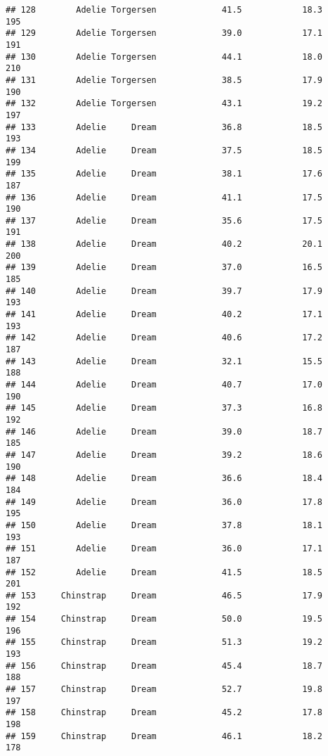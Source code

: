 \documentclass[
]{article}
\begin{document}
\begin{verbatim}
## 128        Adelie Torgersen             41.5            18.3               195
## 129        Adelie Torgersen             39.0            17.1               191
## 130        Adelie Torgersen             44.1            18.0               210
## 131        Adelie Torgersen             38.5            17.9               190
## 132        Adelie Torgersen             43.1            19.2               197
## 133        Adelie     Dream             36.8            18.5               193
## 134        Adelie     Dream             37.5            18.5               199
## 135        Adelie     Dream             38.1            17.6               187
## 136        Adelie     Dream             41.1            17.5               190
## 137        Adelie     Dream             35.6            17.5               191
## 138        Adelie     Dream             40.2            20.1               200
## 139        Adelie     Dream             37.0            16.5               185
## 140        Adelie     Dream             39.7            17.9               193
## 141        Adelie     Dream             40.2            17.1               193
## 142        Adelie     Dream             40.6            17.2               187
## 143        Adelie     Dream             32.1            15.5               188
## 144        Adelie     Dream             40.7            17.0               190
## 145        Adelie     Dream             37.3            16.8               192
## 146        Adelie     Dream             39.0            18.7               185
## 147        Adelie     Dream             39.2            18.6               190
## 148        Adelie     Dream             36.6            18.4               184
## 149        Adelie     Dream             36.0            17.8               195
## 150        Adelie     Dream             37.8            18.1               193
## 151        Adelie     Dream             36.0            17.1               187
## 152        Adelie     Dream             41.5            18.5               201
## 153     Chinstrap     Dream             46.5            17.9               192
## 154     Chinstrap     Dream             50.0            19.5               196
## 155     Chinstrap     Dream             51.3            19.2               193
## 156     Chinstrap     Dream             45.4            18.7               188
## 157     Chinstrap     Dream             52.7            19.8               197
## 158     Chinstrap     Dream             45.2            17.8               198
## 159     Chinstrap     Dream             46.1            18.2               178

\end{verbatim}
\end{document}
